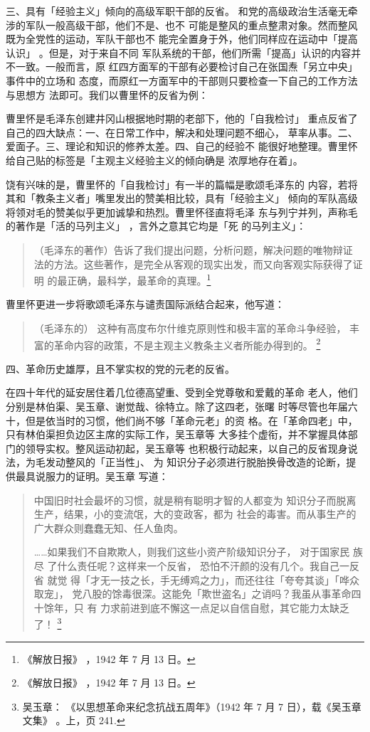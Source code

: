 三、具有「经验主义」倾向的高级军职干部的反省。
和党的高级政治生活毫无牵涉的军队一般高级干部，他们不是、也不
可能是整风的重点整肃对象。然而整风既为全党性的运动，军队干部也不
能完全置身于外，他们同样应在运动中「提高认识」
。但是，对于来自不同
军队系统的干部，他们所需「提高」认识的内容并不一致。一般而言，原
红四方面军的干部有必要检讨自己在张国焘「另立中央」事件中的立场和
态度，而原红一方面军中的干部则只要检查一下自己的工作方法与思想方
法即可。我们以曹里怀的反省为例：

曹里怀是毛泽东创建井冈山根据地时期的老部下，他的「自我检讨」
重点反省了自己的四大缺点：一、在日常工作中，解决和处理问题不细心，
草率从事。二、爱面子。三、理论和知识的修养太差。四、自己的经验不
能很好地整理。曹里怀给自己贴的标签是「主观主义经验主义的倾向确是
浓厚地存在着」。

饶有兴味的是，曹里怀的「自我检讨」有一半的篇幅是歌颂毛泽东的
内容，若将其和「教条主义者」嘴里发出的赞美相比较，具有「经验主义」
倾向的军队高级将领对毛的赞美似乎更加诚挚和热烈。曹里怀径直将毛泽
东与列宁并列，声称毛的著作是「活的马列主义」
，言外之意其它均是「死
的马列主义」：
\begin{quote}
{\fzwkai （毛泽东的著作）告诉了我们提出问题，分析问题，解决问题的唯物辩证
法的方法。这些著作，是完全从客观的现实出发，而又向客观实际获得了证明
的最正确，最科学，最革命的真理。\footnote{《解放日报》
，1942 年 7 月 13 日。}} 
\end{quote}

曹里怀更进一步将歌颂毛泽东与谴责国际派结合起来，他写道：
\begin{quote}
{\fzwkai （毛泽东的）
这种有高度布尔什维克原则性和极丰富的革命斗争经验，
丰
富的革命内容的政策，不是主观主义教条主义者所能办得到的。
\footnote{《解放日报》
，1942 年 7 月 13 日。}} 
\end{quote}

四、革命历史雄厚，且不掌实权的党的元老的反省。

在四十年代的延安居住着几位德高望重、受到全党尊敬和爱戴的革命
老人，他们分别是林伯渠、吴玉章、谢觉哉、徐特立。除了这四老，张曙
时等尽管也年届六十，但是依当时的习惯，他们尚不够「革命元老」的资
格。在「革命四老」中，只有林伯渠担负边区主席的实际工作，吴玉章等
大多挂个虚衔，并不掌握具体部门的领导实权。整风运动初起，吴玉章等
也积极行动起来，以自己的反省现身说法，为毛发动整风的「正当性」、
为
知识分子必须进行脱胎换骨改造的论断，提供最具说服力的证明。吴玉章
写道：
\begin{quote}
{\fzwkai 中国旧时社会最坏的习惯，就是稍有聪明才智的人都变为
知识分子而脱离生产，结果，小的变流氓，大的变政客，都为
社会的毒害。而从事生产的广大群众则蠢蠢无知、任人鱼肉。

……如果我们不自欺欺人，则我们这些小资产阶级知识分子， 对于国家民 族尽
了什么责任呢？这样来一个反省， 恐怕不汗颜的没有几个。我自己一反省 就觉
得「才无一技之长，手无缚鸡之力」，而还往往「夸夸其谈」「哗众取宠」，
党八股的馀毒很深。这能免「欺世盗名」之诮吗？我虽从事革命四十馀年，只 有
力求前进到底不懈这一点足以自信自慰，其它能力太缺乏了！ \footnote{吴玉章：
《以思想革命来纪念抗战五周年》（1942 年 7 月 7 日），载《吴玉章文集》
。上，页 241. }} 
\end{quote}

